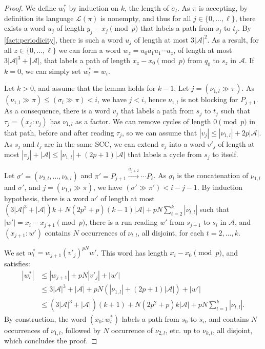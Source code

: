 \documentclass[letterpaper, USenglish, cleveref, autoref, thm-restate, numberwithinsect]{lipics-v2021}
\theoremstyle{theorem}
\theoremstyle{definition}
\newcommand{\Aa}{\mathcal{A}}
\newcommand{\lang}[1]{\mathcal{L}(#1)}
\newcommand{\lefteffect}[2]{(#1 \gg #2)}
\newcommand{\SCCpath}{\pi}
\newcommand{\set}[1]{\{ #1 \}}
\newcommand{\timedword}[2]{(#1:#2)}
\begin{document}
\begin{proof}	
	We define $w_l^*$ by induction on $k$, the length of $\sigma_l$.
	As $\SCCpath$ is accepting, by definition its language $\lang{\SCCpath}$ is nonempty, and thus for all $j \in \set{0, \ldots, \ell}$, there exists a word $u_j$ of length $y_j-x_j \pmod{p}$ that labels a path from $s_j$ to $t_j$.
	By \cref{fact:periodicity}, there is such a word $u_j$ of length at most $3|\Aa|^2$.
	As a result, for all $z \in \set{0, \ldots, \ell}$ we can form a word $w_z = u_0 a_1 u_1 \cdots a_{z}$, of length at most $3 |\Aa|^3 + |\Aa|$, that labels a path of length $x_z-x_0 \pmod{p}$ from $q_{0}$ to $s_z$ in $\Aa$.
	If $k=0$, we can simply set $w_l^* = w_i$.
	
	Let $k> 0$, and assume that the lemma holds for $k-1$.
	Let $j = \lefteffect{\nu_{1,l}}{\SCCpath}$.
	As $\lefteffect{\nu_{1,l}}{\SCCpath} \leq \lefteffect{\sigma_l}{\SCCpath} < i$, we have $j<i$, hence $\nu_{1,l}$ is not blocking for $P_{j+1}$.
	As a consequence, there is a word $v_j$ that labels a path from $s_j$ to $t_j$ such that $\tau_j = \timedword{x_j}{v_j}$ has $\nu_{1,l}$ as a factor.
	We can remove cycles of length $0 \pmod{p}$ in that path, before and after reading $\tau_j$, so we can assume that $|v_j| \leq |\nu_{1,l}| + 2p|\Aa|$. 
	As $s_j$ and $t_j$ are in the same SCC, we can extend $v_j$ into a word $v'_j$ of length at most $|v_j| + |\Aa| \leq |\nu_{1,l}| + (2p+1)|\Aa|$ that labels a cycle from $s_j$ to itself.
	
	Let $\sigma' = (\nu_{2,l}, \ldots, \nu_{k,l})$ and $\SCCpath' = P_{j+1} \xrightarrow{a_{j+2}} \cdots  P_\ell$.
	As $\sigma_l$ is the concatenation of $\nu_{1,l}$ and $\sigma'$, and $j = \lefteffect{\nu_{1,l}}{\SCCpath}$, we have $\lefteffect{\sigma'}{\SCCpath'} < i-j-1$.
	By induction hypothesis, there is a word $w'$ of length at most $(3|\Aa|^3+|\Aa|)k  + N(2p^2+p)(k-1)|\Aa| + pN\sum_{t=2}^{k}|\nu_{t,l}|$ such that $|w'| = x_i-x_{j+1} \pmod{p}$, there is a run reading $w'$ from $s_{j+1}$ to $s_i$ in $\Aa$, and $\timedword{x_{j+1}}{w'}$ contains $N$ occurrences of $\nu_{t,l}$, all disjoint, for each $t = 2,\ldots, k$.

	We set $w_l^* = w_{j+1} (v'_j)^{pN} w'$. This word has length $x_i-x_0 \pmod{p}$, and satisfies:
	\begin{align*}
		|w_l^*| 
			&\le|w_{j+1}|+pN|v'_j|+ |w'|\\
			&\le 3|\Aa|^3+|\Aa| + pN(|\nu_{1,l}| + (2p+1)|\Aa|) +|w'|\\
			&\le (3|\Aa|^3+|\Aa|)(k+1)  + N(2p^2+p)k|\Aa| + pN\sum_{t=1}^k|\nu_{t,l}|.
	\end{align*}
	By construction, the word $\timedword{x_0}{w_l^*}$ labels a path from $s_0$ to $s_i$, and contains $N$ occurrences of $\nu_{1,l}$, followed by $N$ occurrence of $\nu_{2,l}$, etc. up to $\nu_{k,l}$, all disjoint, which concludes the proof.
\end{proof}
\end{document}
